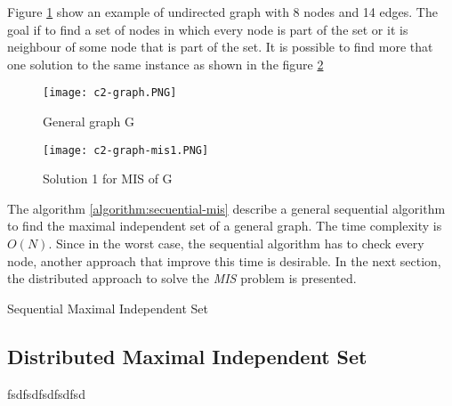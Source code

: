 Figure \ref{fig:graph1} show an example of undirected graph with 8 nodes and 14 edges. The goal if to find a set of nodes in which every node is part of the set or it is neighbour of some node that is part of the set. It is possible to find more that one solution to the same instance as shown in the figure \ref{fig:mis1}  
 
\begin{figure}[h]
\texttt{[image: c2-graph.PNG]} 
\caption{General graph G}
\label{fig:graph1}
\end{figure}
 
\begin{figure}[h]
\texttt{[image: c2-graph-mis1.PNG]}
\caption{Solution 1 for MIS of G}
\label{fig:mis1}
\end{figure}

The algorithm \ref{algorithm:secuential-mis} describe a general sequential algorithm to find the maximal independent set of a general graph. The time complexity is $O(N)$. Since in the worst case, the sequential algorithm has to check every node, another approach that improve this time is desirable. In the next section, the distributed approach to solve the \textit{MIS} problem is presented.

\begin{algorithm}
 \caption{Sequential Maximal Independent Set}
 \label{algorithm:secuential-mis} 

\SetAlgoLined
{}
    
 
\end{algorithm}
 

 
\subsection{Distributed Maximal Independent Set}
fsdfsdfsdfsdfsd
\newpage

